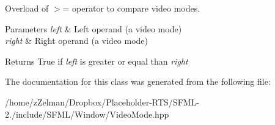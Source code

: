 Overload of $>$= operator to compare video modes. 


\begin{DoxyParams}{Parameters}
{\em left} & Left operand (a video mode) \\
\hline
{\em right} & Right operand (a video mode)\\
\hline
\end{DoxyParams}
\begin{DoxyReturn}{Returns}
True if {\itshape left} is greater or equal than {\itshape right} 
\end{DoxyReturn}


The documentation for this class was generated from the following file\-:\begin{DoxyCompactItemize}
\item 
/home/z\-Zelman/\-Dropbox/\-Placeholder-\/\-R\-T\-S/\-S\-F\-M\-L-\/2./include/\-S\-F\-M\-L/\-Window/Video\-Mode.\-hpp\end{DoxyCompactItemize}
